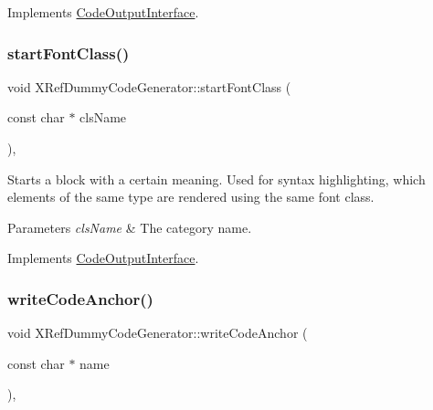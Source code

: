 Implements \mbox{\hyperlink{class_code_output_interface_a2b8ac05a391dae36793aa3aa8714a0f6}{Code\+Output\+Interface}}.

\mbox{\label{class_x_ref_dummy_code_generator_a5c53cb36c03f583b7b236e482a0a6693}} 
\subsubsection{\texorpdfstring{startFontClass()}{startFontClass()}}
{\footnotesize\ttfamily void X\+Ref\+Dummy\+Code\+Generator\+::start\+Font\+Class (\begin{DoxyParamCaption}\item[{const char $\ast$}]{cls\+Name }\end{DoxyParamCaption})\hspace{0.3cm}{\ttfamily [inline]}, {\ttfamily [virtual]}}

Starts a block with a certain meaning. Used for syntax highlighting, which elements of the same type are rendered using the same \textquotesingle{}font class\textquotesingle{}. 
\begin{DoxyParams}{Parameters}
{\em cls\+Name} & The category name. \\
\hline
\end{DoxyParams}


Implements \mbox{\hyperlink{class_code_output_interface_ac90f75968cdcf127e0b02938bdb49d87}{Code\+Output\+Interface}}.

\mbox{\label{class_x_ref_dummy_code_generator_aae68bc8b3e507f39d5613d2840c5f10b}} 
\subsubsection{\texorpdfstring{writeCodeAnchor()}{writeCodeAnchor()}}
{\footnotesize\ttfamily void X\+Ref\+Dummy\+Code\+Generator\+::write\+Code\+Anchor (\begin{DoxyParamCaption}\item[{const char $\ast$}]{name }\end{DoxyParamCaption})\hspace{0.3cm}{\ttfamily [inline]}, {\ttfamily [virtual]}}


